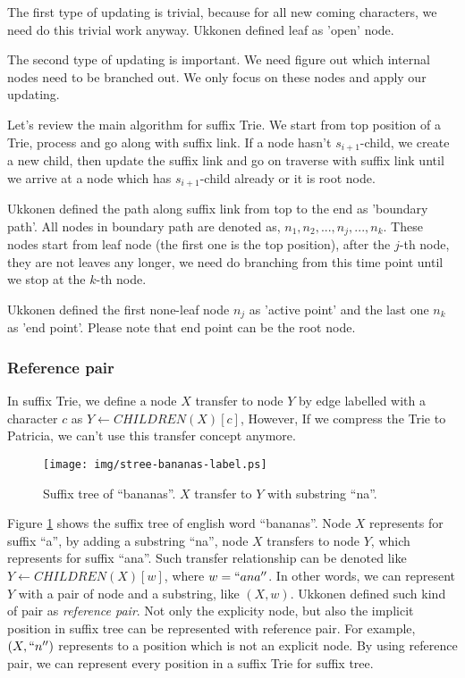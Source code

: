 \documentclass{article}
\begin{document}
The first type of updating is trivial, because for all new coming characters,
we need do this trivial work anyway. Ukkonen defined leaf as 'open' node.

The second type of updating is important. We need figure out which internal
nodes need to be branched out. We only focus on these nodes and apply our
updating.

Let's review the main algorithm for suffix Trie. We start from top position
of a Trie, process and go along with suffix link. If a node hasn't $s_{i+1}$-child,
we create a new child, then update the suffix link and go on traverse with
suffix link until we arrive at a node which has $s_{i+1}$-child already or
it is root node.

Ukkonen defined the path along suffix link from top to the end as 'boundary path'.
All nodes in boundary path are denoted as, $n_1, n_2, ..., n_j, ..., n_k$.
These nodes start from leaf node (the first one is the top position), after
the $j$-th node, they are not leaves any longer, we need do branching from
this time point until we stop at the $k$-th node.

Ukkonen defined the first none-leaf node $n_j$ as 'active point' and the last
one $n_k$ as 'end point'. Please note that end point can be the root node.

\subsubsection{Reference pair}

In suffix Trie, we define a node $X$ transfer to node $Y$ by edge labelled with
a character $c$ as $Y \leftarrow CHILDREN(X)[c]$, However, If we compress the Trie
to Patricia, we can't use this transfer concept anymore.

\begin{figure}[htbp]
   \begin{center}
     \texttt{[image: img/stree-bananas-label.ps]}
     \caption{Suffix tree of ``bananas''. $X$ transfer to $Y$ with substring ``na''.}
     \label{fig:stree-bananas-label}
   \end{center}
\end{figure}

Figure \ref{fig:stree-bananas-label} shows the suffix tree of english word ``bananas''.
Node $X$ represents for suffix ``a'', by adding a substring ``na'', node $X$ transfers
to node $Y$, which represents for suffix ``ana''. Such transfer relationship can be
denoted like $Y \leftarrow CHILDREN(X)[w]$, where $w=``ana''$. In other words, we can
represent $Y$ with a pair of node and a substring, like $(X, w)$. Ukkonen defined
such kind of pair as {\em reference pair}. Not only the explicity node, but also the
implicit position in suffix tree can be represented with reference pair. For example,
$(X, ``n'')$ represents to a position which is not an explicit node. By using reference
pair, we can represent every position in a suffix Trie for suffix tree.
\end{document}
